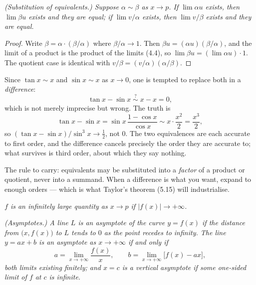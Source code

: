 \emph{(Substitution of equivalents.) Suppose $\alpha \sim \beta$ as
$x \to p$. If $\lim \alpha u$ exists, then $\lim \beta u$ exists and they are
equal; if $\lim v/\alpha$ exists, then $\lim v/\beta$ exists and they are
equal.}
\begin{proof}
Write $\beta = \alpha \cdot (\beta/\alpha)$ where $\beta/\alpha \to 1$. Then
$\beta u = (\alpha u)(\beta/\alpha)$, and the limit of a product is the
product of the limits (4.4), so $\lim \beta u = (\lim \alpha u)\cdot 1$.
The quotient case is identical with $v/\beta = (v/\alpha)(\alpha/\beta)$.
\end{proof}

\begin{pitfall}
Since $\tan x \sim x$ and $\sin x \sim x$ as $x \to 0$, one is tempted to
replace both in a \emph{difference}:
\[ \tan x - \sin x \;\overset{?}{\sim}\; x - x = 0 , \]
which is not merely imprecise but wrong. The truth is
\[ \tan x - \sin x = \sin x\,\frac{1-\cos x}{\cos x}
   \sim x \cdot \frac{x^2}{2} = \frac{x^3}{2}, \]
so $(\tan x - \sin x)/\sin^3 x \to \tfrac12$, not $0$. The two equivalences
are each accurate to first order, and the difference cancels precisely the
order they are accurate to; what survives is third order, about which they
say nothing.

The rule to carry: equivalents may be substituted into a \emph{factor} of a
product or quotient, never into a summand. When a difference is what you
want, expand to enough orders --- which is what Taylor's theorem (5.15) will
industrialise.
\end{pitfall}

\emph{$f$ is an \emph{infinitely large quantity} as $x \to p$ if
$|f(x)| \to +\infty$.}

\emph{(Asymptotes.) A line $L$ is an \emph{asymptote} of the curve $y=f(x)$
if the distance from $\bigl(x,f(x)\bigr)$ to $L$ tends to $0$ as the point
recedes to infinity. The line $y = ax+b$ is an asymptote as $x \to +\infty$
if and only if}
\[ a = \lim_{x\to+\infty}\frac{f(x)}{x},
   \qquad b = \lim_{x\to+\infty}\bigl[f(x)-ax\bigr], \]
\emph{both limits existing finitely; and $x = c$ is a vertical asymptote if
some one-sided limit of $f$ at $c$ is infinite.}

